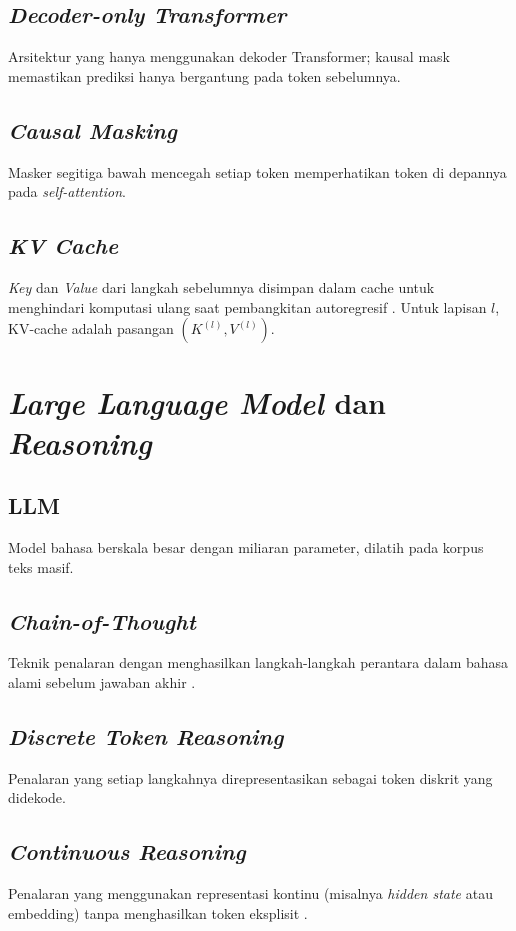 \subsection{\textit{Decoder-only Transformer}}
Arsitektur yang hanya menggunakan dekoder Transformer; kausal mask memastikan prediksi hanya bergantung pada token sebelumnya.

\subsection{\textit{Causal Masking}}
Masker segitiga bawah mencegah setiap token memperhatikan token di depannya pada \textit{self-attention}.

\subsection{\textit{KV Cache}}
\textit{Key} dan \textit{Value} dari langkah sebelumnya disimpan dalam cache untuk menghindari komputasi ulang saat pembangkitan autoregresif \citep{latentmas}. Untuk lapisan \(l\), KV-cache adalah pasangan \((K^{(l)}, V^{(l)})\).

\section{\textit{Large Language Model} dan \textit{Reasoning}}

\subsection{LLM}
Model bahasa berskala besar dengan miliaran parameter, dilatih pada korpus teks masif.

\subsection{\textit{Chain-of-Thought}}
Teknik penalaran dengan menghasilkan langkah-langkah perantara dalam bahasa alami sebelum jawaban akhir \citep{guo}.

\subsection{\textit{Discrete Token Reasoning}}
Penalaran yang setiap langkahnya direpresentasikan sebagai token diskrit yang didekode.

\subsection{\textit{Continuous Reasoning}}
Penalaran yang menggunakan representasi kontinu (misalnya \textit{hidden state} atau embedding) tanpa menghasilkan token eksplisit \citep{latentsurvey}.

